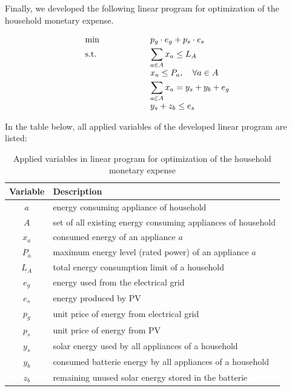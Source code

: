 Finally, we developed the following linear program for optimization of the household monetary expense.

\begin{equation}
 \begin{array}{ll@{}ll}
 \text{min} & \displaystyle p_{g} \cdot e_{g} + p_{s} \cdot e_{s} &\\
 \text{s.t.}& \displaystyle \sum\limits_{a \in A}^{} x_{a} \leq L_{A} \\
                    & \displaystyle x_{a} \leq P_{a}, \quad \forall a \in A \\
                    & \displaystyle \sum\limits_{a \in A}^{} x_{a} = y_{s} + y_{b} + e_{g} \\
                    & \displaystyle y_{s} + z_{b} \leq e_{s}
 \end{array}
\end{equation}

\clearpage
In the table below, all applied variables of the developed linear program are listed:

\begin{longtable}{c|l}
	\caption{Applied variables in linear program for optimization of the household monetary expense} 
	\label{table:applied_variables_lp} 
	\\
	\textbf{Variable} & \textbf{Description} \\
	\hline
    $a$ & energy consuming appliance of household \\
	$A$ & set of all existing energy consuming appliances of household \\
	$x_{a}$ & consumed energy of an appliance $a$ \\
	$P_{a}$ & maximum energy level (rated power) of an appliance $a$ \\
	$L_{A}$ & total energy consumption limit of a household \\
	$e_{g}$ & energy used from the electrical grid \\
	$e_{s}$ & energy produced by PV \\
	$p_{g}$ & unit price of energy from electrical grid \\
	$p_{s}$ & unit price of energy from PV \\
	$y_{s}$ & solar energy used by all appliances of a household \\
	$y_{b}$ & consumed batterie energy by all appliances of a household \\
	$z_{b}$ & remaining unused solar energy stored in the batterie \\
\end{longtable} 

